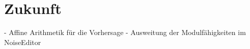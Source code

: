 \chapter{Zukunft}
	- Affine Arithmetik für die Vorhersage
	- Ausweitung der Modulfähigkeiten im NoiseEditor
